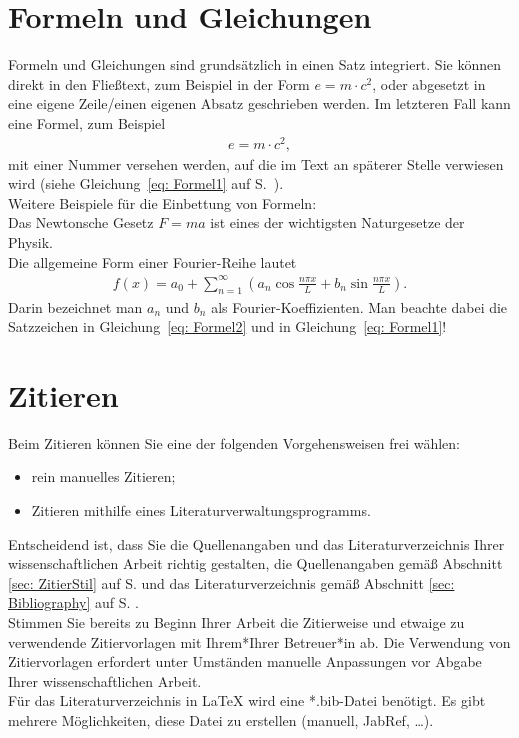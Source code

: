 \section{Formeln und Gleichungen}
Formeln und Gleichungen sind grundsätzlich in einen Satz integriert. Sie können direkt in den Fließtext, zum Beispiel in der Form $e=m\cdot c^2$, oder abgesetzt in eine eigene Zeile/einen eigenen Absatz geschrieben werden.
Im letzteren Fall kann eine Formel, zum Beispiel
%
\begin{align}
	e=m\cdot c^2,
	\label{eq: Formel1}
\end{align}
%
mit einer Nummer versehen werden, auf die im Text an späterer Stelle verwiesen wird (siehe Gleichung~\ref{eq: Formel1} auf S.~\pageref{eq: Formel1}).
\vspace{6pt}\\
Weitere Beispiele für die Einbettung von Formeln:
\\
Das Newtonsche Gesetz $F=ma$ ist eines der wichtigsten Naturgesetze der Physik.
\\
Die allgemeine Form einer Fourier-Reihe lautet
%
\begin{align}
	f(x)=a_0 +\sum_{n=1}^\infty \left( a_n \cos\frac{n\pi x}{L} + b_n \sin\frac{n\pi x}{L} \right) .
	\label{eq: Formel2}
\end{align}
%
Darin bezeichnet man $a_n$ und $b_n$ als Fourier-Koeffizienten. Man beachte dabei die Satzzeichen
in Gleichung~\ref{eq: Formel2} und in Gleichung~\ref{eq: Formel1}!

\newpage
\section{Zitieren}
Beim Zitieren können Sie eine der folgenden Vorgehensweisen frei wählen:
\begin{itemize}
	\item rein manuelles Zitieren;
	\item Zitieren mithilfe eines Literaturverwaltungsprogramms.
\end{itemize}
Entscheidend ist, dass Sie die Quellenangaben und das Literaturverzeichnis Ihrer wissenschaftlichen Arbeit richtig gestalten, \dah die Quellenangaben gemäß Abschnitt \ref{sec: ZitierStil} auf S. \pageref{sec: ZitierStil} und das Literaturverzeichnis gemäß Abschnitt \ref{sec: Bibliography} auf S. \pageref{sec: Bibliography}.\\
Stimmen Sie bereits zu Beginn Ihrer Arbeit die Zitierweise und etwaige zu verwendende Zitiervorlagen mit Ihrem*Ihrer Betreuer*in ab. Die Verwendung von Zitiervorlagen erfordert unter Umständen manuelle Anpassungen vor Abgabe Ihrer wissenschaftlichen Arbeit.\\
Für das Literaturverzeichnis in {\LaTeX} wird eine *.bib-Datei benötigt. Es gibt mehrere Möglichkeiten, diese Datei zu erstellen (manuell, JabRef, \dots).

